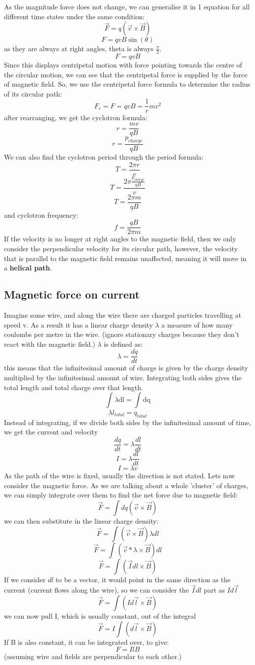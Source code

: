\documentclass[10pt]{report}
\begin{document}
{{{As the magnitude force does not change, we can generalise it in 1 equation for all different time states under the same condition: \[
\vec{F}=q\left(\vec{v}\times\vec{B}\right)
\] \[
F=qvB\sin\left(\theta\right)
\] as they are always at right angles, theta is always $\frac{\pi}{2}$. \[
F=qvB
\] Since this displays centripetal motion with force pointing towards the centre of the circular motion, we can see that the centripetal force is supplied by the force of magnetic field. So, we use the centripetal force formula to determine the radius of its circular path: \[
F_{c}=F=qvB=\frac{1}{r}mv^{2}
\] after rearranging, we get the cyclotron formula: \[
r=\frac{mv}{qB}
\] \[
r=\frac{p_{charge}}{qB}
\] We can also find the cyclotron period through the period formula: \[
T=\frac{2\pi r}{v}
\] \[
T=\frac{2\pi \frac{p_{charge}}{qB}}{v}
\] \[
T=\frac{2\pi m}{qB}
\] and cyclotron frequency: \[
f=\frac{qB}{2\pi m}
\] If the velocity is no longer at right angles to the magnetic field, then we only consider the perpendicular velocity for its circular path, however, the velocity that is parallel to the magnetic field remains unaffected, meaning it will move in a \textbf{helical path}.
}
\subsection{Magnetic force on current}
\par{Imagine some wire, and along the wire there are charged particles travelling at speed v. As a result it has a linear charge density $\lambda$ a measure of how many coulombs per metre in the wire. (ignore stationary charges because they don't react with the magnetic field.) $\lambda$ is defined as: \[
\lambda=\frac{dq}{dt}
\] this means that the infinitesimal amount of charge is given by the charge density multiplied by the infinitesimal amount of wire. Integrating both sides gives the total length and total charge over that length. \[
\int_{}^{}{\lambda}\mathrm{dl}=\int_{}^{}{}\mathrm{dq}
\] \[
\lambda l_{total}=q_{total}
\] Instead of integrating, if we divide both sides by the infinitesimal amount of time, we get the current and velocity \[
\frac{dq}{dt}=\lambda\frac{dl}{dt}
\] \[
I=\lambda\frac{dl}{dt}
\] \[
I=\lambda v
\] As the path of the wire is fixed, usually the direction is not stated. Lets now consider the magnetic force. As we are talking about a whole 'cluster' of charges, we can simply integrate over them to find the net force due to magnetic field: \[
\vec{F}=\int dq\left(\vec{v}\times\vec{B}\right)
\] we can then substitute in the linear charge density:  \[
\vec{F}=\int \left(\vec{v}\times\vec{B}\right)\lambda dl
\] \[
\vec{F}=\int \left(\vec{v}*\lambda\times\vec{B}\right) dl
\] \[
\vec{F}=\int \left(\vec{I}dl\times\vec{B}\right)
\] If we consider $dl$ to be a vector, it would point in the same direction as the current (current flows along the wire), so we can consider the  $\vec{I}dl$ part as $Id\vec{l}$ \[
\vec{F}=\int \left(Id\vec{l}\times\vec{B}\right)
\] we can now pull I, which is usually constant, out of the integral \[
\vec{F}=I\int \left(d\vec{l}\times\vec{B}\right)
\] If B is also constant, it can be integrated over, to give: \[
F=IlB
\] (assuming wire and fields are perpendicular to each other.)
}
}}
\end{document}
